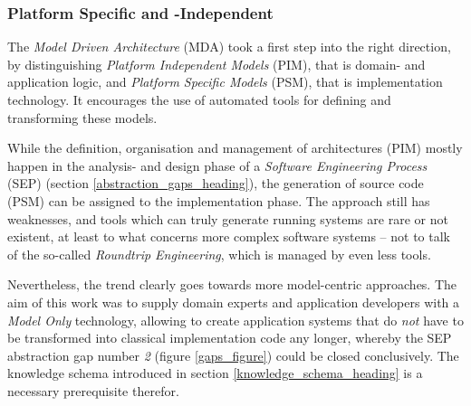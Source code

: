 %
%
%
%
%
%
%

\subsubsection{Platform Specific and -Independent}
\label{platform_specific_and_independent_heading}

The \emph{Model Driven Architecture} (MDA) \cite{mda} took a first step into
the right direction, by distinguishing \emph{Platform Independent Models}
(PIM), that is domain- and application logic, and \emph{Platform Specific Models}
(PSM), that is implementation technology. It encourages the use of automated
tools for defining and transforming these models.

While the definition, organisation and management of architectures (PIM) mostly
happen in the analysis- and design phase of a \emph{Software Engineering Process}
(SEP) (section \ref{abstraction_gaps_heading}), the generation of source code
(PSM) can be assigned to the implementation phase. The approach still has
weaknesses, and tools which can truly generate running systems are rare or not
existent, at least to what concerns more complex software systems -- not to
talk of the so-called \emph{Roundtrip Engineering}, which is managed by even
less tools.

Nevertheless, the trend clearly goes towards more model-centric approaches. The
aim of this work was to supply domain experts and application developers with a
\emph{Model Only} technology, allowing to create application systems that do
\emph{not} have to be transformed into classical implementation code any longer,
whereby the SEP abstraction gap number \emph{2} (figure \ref{gaps_figure})
could be closed conclusively. The knowledge schema introduced in section
\ref{knowledge_schema_heading} is a necessary prerequisite therefor.

